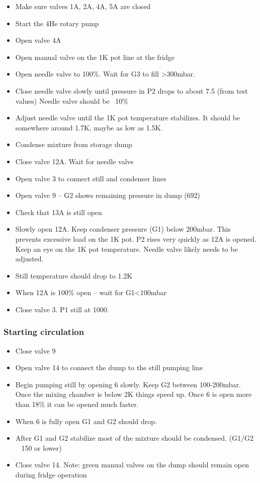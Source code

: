 \begin{itemize}
\item Make sure valves 1A, 2A, 4A, 5A are closed
\item Start the 4He rotary pump
\item Open valve 4A
\item Open manual valve on the 1K pot line at the fridge
\item Open needle valve to 100\%. Wait for G3 to fill >300mbar. 
\item Close needle valve slowly until pressure in P2 drops to about 7.5 (from test values) Needle valve should be ~10\%
\item Adjust needle valve until the 1K pot temperature stabilizes. It should be somewhere around 1.7K, maybe as low as 1.5K.
\item Condense mixture from storage dump
\item Close valve 12A. Wait for needle valve
\item Open valve 3 to connect still and condenser lines
\item Open valve 9 – G2 shows remaining pressure in dump (692)
\item Check that 13A is still open
\item Slowly open 12A. Keep condenser pressure (G1) below 200mbar. This prevents excessive load on the 1K pot. P2 rises very quickly as 12A is opened. Keep an eye on the 1K pot temperature. Needle valve likely needs to be adjusted.
\item Still temperature should drop to 1.2K
\item When 12A is 100\% open – wait for G1<100mbar
\item Close valve 3. P1 still at 1000.
\end{itemize}

\subsubsection*{Starting circulation}

\begin{itemize}
\item Close valve 9
\item Open valve 14 to connect the dump to the still pumping line
\item Begin pumping still by opening 6 slowly. Keep G2 between 100-200mbar. Once the mixing chamber is below 2K things speed up. Once 6 is open more than 18\% it can be opened much faster.
\item When 6 is fully open G1 and G2 should drop.
\item After G1 and G2 stabilize most of the mixture should be condensed. (G1/G2 ~ 150 or lower)
\item Close valve 14. Note: green manual valves on the dump should remain open during fridge operation
\end{itemize}

